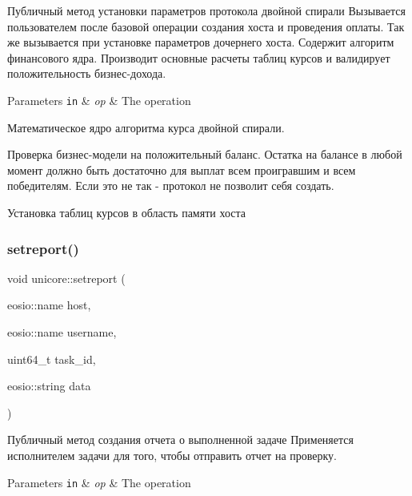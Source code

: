 Публичный метод установки параметров протокола двойной спирали Вызывается пользователем после базовой операции создания хоста и проведения оплаты. Так же вызывается при установке параметров дочернего хоста. Содержит алгоритм финансового ядра. Производит основные расчеты таблиц курсов и валидирует положительность бизнес-\/дохода. 


\begin{DoxyParams}[1]{Parameters}
\mbox{\tt in}  & {\em op} & The operation \\
\hline
\end{DoxyParams}
Математическое ядро алгоритма курса двойной спирали.

Проверка бизнес-\/модели на положительный баланс. Остатка на балансе в любой момент должно быть достаточно для выплат всем проигравшим и всем победителям. Если это не так -\/ протокол не позволит себя создать.

Установка таблиц курсов в область памяти хоста\mbox{\label{classunicore_a178fc39ee1d642454bddeaa3f6084d00}} 
\subsubsection{\texorpdfstring{setreport()}{setreport()}}
{\footnotesize\ttfamily void unicore\+::setreport (\begin{DoxyParamCaption}\item[{eosio\+::name}]{host,  }\item[{eosio\+::name}]{username,  }\item[{uint64\+\_\+t}]{task\+\_\+id,  }\item[{eosio\+::string}]{data }\end{DoxyParamCaption})}



Публичный метод создания отчета о выполненной задаче Применяется исполнителем задачи для того, чтобы отправить отчет на проверку. 


\begin{DoxyParams}[1]{Parameters}
\mbox{\tt in}  & {\em op} & The operation \\
\hline
\end{DoxyParams}
\mbox{\label{classunicore_acfa60cf59df336c954662c1ae46a67b2}} 

